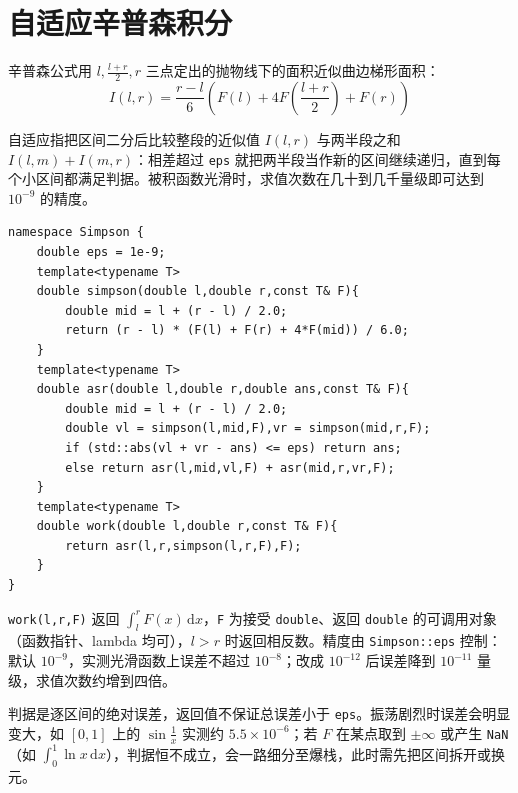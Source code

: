 \section{自适应辛普森积分}

辛普森公式用 $l,\frac{l+r}{2},r$ 三点定出的抛物线下的面积近似曲边梯形面积：
$$I(l,r)=\frac{r-l}{6}\left(F(l)+4F\!\left(\frac{l+r}{2}\right)+F(r)\right)$$

自适应指把区间二分后比较整段的近似值 $I(l,r)$ 与两半段之和 $I(l,m)+I(m,r)$：相差超过 \texttt{eps} 就把两半段当作新的区间继续递归，直到每个小区间都满足判据。被积函数光滑时，求值次数在几十到几千量级即可达到 $10^{-9}$ 的精度。

\begin{lstlisting}
namespace Simpson {
    double eps = 1e-9;
    template<typename T>
    double simpson(double l,double r,const T& F){
        double mid = l + (r - l) / 2.0;
        return (r - l) * (F(l) + F(r) + 4*F(mid)) / 6.0;
    }
    template<typename T>
    double asr(double l,double r,double ans,const T& F){
        double mid = l + (r - l) / 2.0;
        double vl = simpson(l,mid,F),vr = simpson(mid,r,F);
        if (std::abs(vl + vr - ans) <= eps) return ans;
        else return asr(l,mid,vl,F) + asr(mid,r,vr,F);
    }
    template<typename T>
    double work(double l,double r,const T& F){
        return asr(l,r,simpson(l,r,F),F);
    }
}
\end{lstlisting}

\texttt{work(l,r,F)} 返回 $\int_l^rF(x)\,\mathrm dx$，\texttt{F} 为接受 \texttt{double}、返回 \texttt{double} 的可调用对象（函数指针、lambda 均可），$l>r$ 时返回相反数。精度由 \texttt{Simpson::eps} 控制：默认 $10^{-9}$，实测光滑函数上误差不超过 $10^{-8}$；改成 $10^{-12}$ 后误差降到 $10^{-11}$ 量级，求值次数约增到四倍。

判据是逐区间的绝对误差，返回值不保证总误差小于 \texttt{eps}。振荡剧烈时误差会明显变大，如 $[0,1]$ 上的 $\sin\frac1x$ 实测约 $5.5\times10^{-6}$；若 $F$ 在某点取到 $\pm\infty$ 或产生 \texttt{NaN}（如 $\int_0^1\ln x\,\mathrm dx$），判据恒不成立，会一路细分至爆栈，此时需先把区间拆开或换元。
